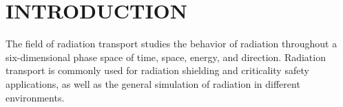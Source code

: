 %
%
%
%



\pagestyle{plain} %
\setcounter{page}{1}


\chapter{\uppercase {INTRODUCTION}}\label{cha:introduction}

The field of radiation transport studies the behavior of radiation throughout a six-dimensional phase space of time, space, energy, and direction. 
Radiation transport is commonly used for radiation shielding and criticality safety applications, as well as the general simulation of radiation in different environments. 


